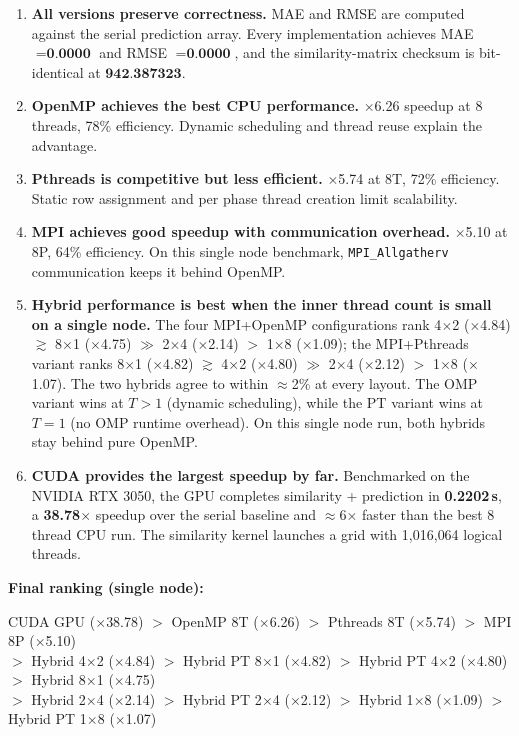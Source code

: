 \documentclass[11pt,a4paper]{article}
\newcommand{\code}[1]{\texttt{\small #1}}
\begin{document}
\begin{enumerate}
  \item \textbf{All versions preserve correctness.} MAE and RMSE are computed
        against the serial prediction array. Every implementation achieves
        MAE $=\textbf{0.0000}$ and RMSE $=\textbf{0.0000}$, and the
        similarity-matrix checksum is bit-identical at $\textbf{942.387323}$.
  \item \textbf{OpenMP achieves the best CPU performance.} $\times$6.26 speedup at
        8 threads, 78\% efficiency. Dynamic scheduling and thread reuse explain
        the advantage.
  \item \textbf{Pthreads is competitive but less efficient.} $\times$5.74 at 8T,
        72\% efficiency. Static row assignment and per phase thread creation
        limit scalability.
  \item \textbf{MPI achieves good speedup with communication overhead.}
        $\times$5.10 at 8P, 64\% efficiency. On this single node benchmark,
        \code{MPI\_Allgatherv} communication keeps it behind OpenMP.
  \item \textbf{Hybrid performance is best when the inner thread count is small
        on a single node.} The four MPI+OpenMP configurations rank
        4$\times$2 ($\times$4.84) $\gtrsim$ 8$\times$1 ($\times$4.75)
        $\gg$ 2$\times$4 ($\times$2.14) $>$ 1$\times$8 ($\times$1.09); the
        MPI+Pthreads variant ranks 8$\times$1 ($\times$4.82) $\gtrsim$
        4$\times$2 ($\times$4.80) $\gg$ 2$\times$4 ($\times$2.12) $>$
        1$\times$8 ($\times$1.07). The two hybrids agree to within $\approx$2\%
        at every layout. The OMP variant wins at $T>1$ (dynamic scheduling),
        while the PT variant wins at $T=1$ (no OMP runtime overhead). On this
        single node run, both hybrids stay behind pure OpenMP.
  \item \textbf{CUDA provides the largest speedup by far.} Benchmarked on the
        NVIDIA RTX 3050, the GPU completes similarity + prediction in
        \textbf{0.2202\,s}, a \textbf{38.78$\times$} speedup over the serial
        baseline and $\approx$6$\times$ faster than the best 8 thread CPU run.
        The similarity kernel launches a grid with 1{,}016{,}064 logical
        threads.
\end{enumerate}

\textbf{Final ranking (single node):}
\begin{center}
CUDA GPU ($\times$38.78)
$>$ OpenMP 8T ($\times$6.26)
$>$ Pthreads 8T ($\times$5.74)
$>$ MPI 8P ($\times$5.10) \\[2pt]
$>$ Hybrid 4$\times$2 ($\times$4.84)
$>$ Hybrid PT 8$\times$1 ($\times$4.82)
$>$ Hybrid PT 4$\times$2 ($\times$4.80)
$>$ Hybrid 8$\times$1 ($\times$4.75) \\[2pt]
$>$ Hybrid 2$\times$4 ($\times$2.14)
$>$ Hybrid PT 2$\times$4 ($\times$2.12)
$>$ Hybrid 1$\times$8 ($\times$1.09)
$>$ Hybrid PT 1$\times$8 ($\times$1.07)
\end{center}
\end{document}
